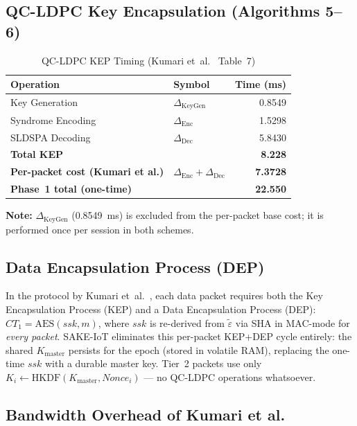 \documentclass[conference]{IEEEtran}
\newcommand{\Kmaster}{K_{\mathrm{master}}}
\begin{document}
\subsection{QC-LDPC Key Encapsulation (Algorithms 5--6)}

\begin{table}[!t]
\centering
\caption{QC-LDPC KEP Timing (Kumari et~al.~\cite{kumari2022} Table~7)}
\label{tab:qcldpc}
\begin{tabular}{llr}
\toprule
\textbf{Operation} & \textbf{Symbol} & \textbf{Time (ms)} \\
\midrule
Key Generation & $\Delta_{\mathrm{KeyGen}}$ & 0.8549 \\
Syndrome Encoding & $\Delta_{\mathrm{Enc}}$ & 1.5298 \\
SLDSPA Decoding & $\Delta_{\mathrm{Dec}}$ & 5.8430 \\
\midrule
\textbf{Total KEP} & & \textbf{8.228} \\
\midrule
\textbf{Per-packet cost (Kumari et al.)} & $\Delta_{\mathrm{Enc}}+\Delta_{\mathrm{Dec}}$ & \textbf{7.3728} \\
\textbf{Phase~1 total (one-time)} & & \textbf{22.550} \\
\bottomrule
\end{tabular}
\end{table}

\noindent\textbf{Note:} $\Delta_{\mathrm{KeyGen}}$ (0.8549~ms) is
excluded from the per-packet base cost; it is performed once per
session in both schemes.

\subsection{Data Encapsulation Process (DEP)}

In the protocol by Kumari et~al.~\cite{kumari2022}, each data packet requires both the Key
Encapsulation Process (KEP) and a Data Encapsulation Process (DEP):
$CT_1 = \mathrm{AES}(\mathit{ssk}, m)$, where $\mathit{ssk}$ is re-derived
from $\tilde{\varepsilon}$ via SHA in MAC-mode for \emph{every packet}.
SAKE-IoT eliminates this per-packet KEP+DEP cycle entirely: the shared $\Kmaster$
persists for the epoch (stored in volatile RAM), replacing the one-time $\mathit{ssk}$
with a durable master key. Tier~2 packets use only $K_i \leftarrow
\mathrm{HKDF}(\Kmaster, \mathit{Nonce}_i)$ --- no QC-LDPC operations whatsoever.

\subsection{Bandwidth Overhead of Kumari et al.}
\end{document}
